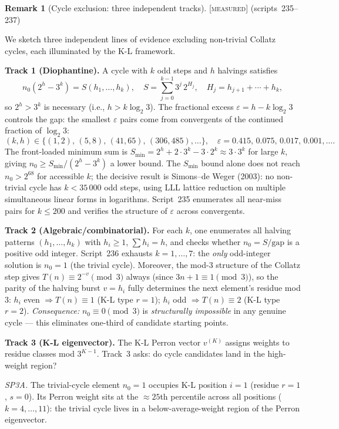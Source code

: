 \documentclass[11pt]{article}
\theoremstyle{definition}
\newtheorem{remark}[theorem]{Remark}
\newcommand{\MEASURED}{\textup{[\textsc{measured}]}}
\begin{document}
\begin{remark}[Cycle exclusion: three independent tracks]\label{rem:cycle_excl}
\MEASURED{} (scripts~235--237)

We sketch three independent lines of evidence excluding non-trivial Collatz cycles,
each illuminated by the K-L framework.

\textbf{Track 1 (Diophantine).}
A cycle with $k$ odd steps and $h$ halvings satisfies
\[
  n_0(2^h - 3^k) = S(h_1,\ldots,h_k),
  \quad S = \sum_{j=0}^{k-1} 3^j\,2^{H_j},\quad H_j = h_{j+1}+\cdots+h_k,
\]
so $2^h > 3^k$ is necessary (i.e., $h > k\log_2 3$). The fractional excess
$\varepsilon = h - k\log_2 3$ controls the gap: the smallest $\varepsilon$ pairs
come from convergents of the continued fraction of $\log_2 3$:
\[
(k,h) \in \{(1,2),\,(5,8),\,(41,65),\,(306,485),\ldots\},\quad
\varepsilon = 0.415,\,0.075,\,0.017,\,0.001,\ldots.
\]
The front-loaded minimum sum is $S_{\min} = 2^h + 2\cdot3^k - 3\cdot2^k \approx 3\cdot3^k$
for large $k$, giving $n_0 \ge S_{\min}/(2^h - 3^k)$ a lower bound.
The $S_{\min}$ bound alone does not reach $n_0 > 2^{68}$ for accessible $k$;
the decisive result is Simons--de Weger (2003): no non-trivial cycle has
$k < 35\,000$ odd steps, using LLL lattice reduction on multiple simultaneous
linear forms in logarithms.
Script~235 enumerates all near-miss pairs for $k \le 200$ and verifies the
structure of $\varepsilon$ across convergents.

\textbf{Track 2 (Algebraic/combinatorial).}
For each $k$, one enumerates all halving patterns $(h_1,\ldots,h_k)$ with
$h_i \ge 1$, $\sum h_i = h$, and checks whether $n_0 = S/\mathrm{gap}$ is
a positive odd integer.
Script~236 exhausts $k = 1, \ldots, 7$: the \emph{only} odd-integer solution
is $n_0 = 1$ (the trivial cycle).
Moreover, the mod-$3$ structure of the Collatz step gives
$T(n) \equiv 2^{-v} \pmod{3}$ always (since $3n+1 \equiv 1 \pmod{3}$), so the
parity of the halving burst $v = h_i$ fully determines the next element's residue
mod $3$: $h_i$ even $\Rightarrow T(n) \equiv 1$ (K-L type $r=1$);
$h_i$ odd $\Rightarrow T(n) \equiv 2$ (K-L type $r=2$).
\emph{Consequence:} $n_0 \equiv 0 \pmod{3}$ is \emph{structurally impossible} in
any genuine cycle --- this eliminates one-third of candidate starting points.

\textbf{Track 3 (K-L eigenvector).}
The K-L Perron vector $v^{(K)}$ assigns weights to residue classes mod $3^{K-1}$.
Track~3 asks: do cycle candidates land in the high-weight region?

\emph{SP3A.} The trivial-cycle element $n_0 = 1$ occupies K-L position $i=1$
(residue $r=1$, $s=0$). Its Perron weight sits at the $\approx 25$th percentile
across all positions ($k = 4, \ldots, 11$): the trivial cycle lives in a
below-average-weight region of the Perron eigenvector.


\end{remark}
\end{document}
